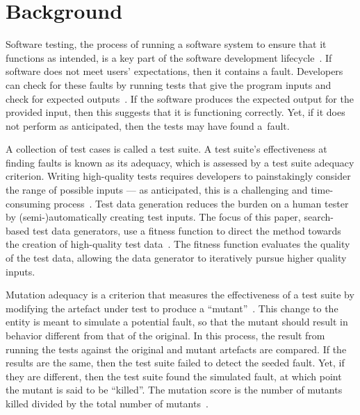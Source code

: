 \section{Background}\label{sec:background}


Software testing, the process of running a software system to ensure that it functions as intended, is a key part of the
software development lifecycle~\cite{Kapfhammer2004}. If software does not meet users' expectations, then it contains a
fault. Developers can check for these faults by running tests that give the program inputs and check for expected
outputs~\cite{Kapfhammer2010}. If the software produces the expected output for the provided input, then this suggests
that it is functioning correctly. Yet, if it does not perform as anticipated, then the tests may have found \mbox{a
fault}.


A collection of test cases is called a test suite. A test suite's effectiveness at finding faults is known as its
adequacy, which is assessed by a test suite adequacy criterion.  Writing high-quality tests requires developers to
painstakingly consider the range of possible inputs --- as anticipated, this is a challenging and time-consuming
process~\cite{Fraser2015}. Test data generation reduces the burden on a human tester by (semi-)automatically creating
test inputs.  The focus of this paper, search-based test data generators, use a fitness function to direct the
method towards the creation of high-quality test data~\cite{STVR:STVR294}. The fitness function evaluates the quality of
the test data, allowing the data generator to iteratively pursue higher quality inputs.


Mutation adequacy is a criterion that measures the effectiveness of a test suite by modifying the artefact under test to
produce a ``mutant''~\cite{Just2011a}. This change to the entity is meant to simulate a potential fault, so that the
mutant should result in behavior different from that of the original. In this process, the result from running the tests
against the original and mutant artefacts are compared. If the results are the same, then the test suite failed to
detect the seeded fault.  Yet, if they are different, then the test suite found the simulated fault, at which point the
mutant is said to be ``killed''.  The mutation score is the number of mutants killed divided by the total number of
mutants~\cite{Just2011a}.

